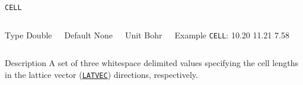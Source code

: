 \documentclass[xcolor=dvipsnames,t]{beamer}
\begin{document}
\begin{frame}[allowframebreaks]{\texttt{CELL}} \label{CELL}
\vspace*{-12pt}
\begin{columns}
\begin{block}{Type}
Double
\end{block}

\begin{block}{Default}
None
\end{block}

\begin{block}{Unit}
Bohr
\end{block}
    
\begin{block}{Example}
\texttt{CELL}: 10.20 11.21 7.58
\end{block}
\end{columns}
\begin{block}{Description}
A set of three whitespace delimited values specifying the cell lengths in the lattice vector (\hyperlink{LATVEC}{\texttt{LATVEC}}) directions, respectively.
\end{block}


\end{frame}
\end{document}
